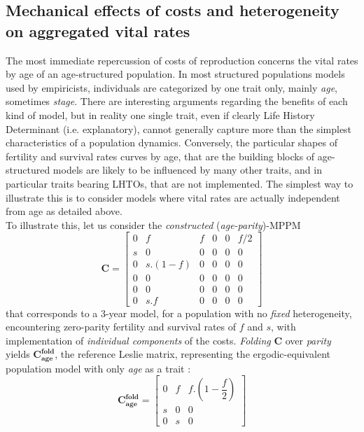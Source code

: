 \documentclass[10pt,a4paper]{article}
\begin{document}
\subsection{Mechanical effects of costs and heterogeneity on aggregated vital rates} %

\label{sec:mecheff}
The most immediate repercussion of costs of reproduction concerns the vital rates by age of an age-structured population. In most structured populations models used by empiricists, individuals are categorized by one trait only, mainly \emph{age}, sometimes \emph{stage}. There are interesting arguments regarding the benefits of each kind of model, but in reality one single trait, even if clearly Life History Determinant (i.e. explanatory), cannot generally capture more than the simplest characteristics of a population dynamics. 
Conversely, the particular shapes of fertility and survival rates curves by age, that are the building blocks of age-structured models are likely to be influenced by many other traits, and in particular traits bearing LHTOs, that are not implemented. The simplest way to illustrate this is to consider models where vital rates are actually independent from age as detailed above.\\

To illustrate this, let us consider the \emph{constructed} (\emph{age-parity})-MPPM 
\[
\mathbf{C}=\begin{bmatrix} 0 & {f} & {f} & 0 & 0 & {f/2}\\
{s} & 0 & 0  & 0 & 0 & 0\\ 0 & {s.(1-f)} & 0 & 0  & 0 & 0 \\
0 & 0 & 0 & 0 & 0  & 0 \\ 0 & 0 & 0 & 0  & 0 & 0 \\
0 & {s.f}  & 0 & 0 & 0 & 0 \end{bmatrix}  
\]
that corresponds to a 3-year model, for a population with no \emph{fixed} heterogeneity, encountering zero-parity fertility and survival rates of $f$ and $s$, with implementation of \emph{individual components} of the costs. \emph{Folding} $\mathbf{C}$ over \emph{parity} yields $\mathbf{C_{age}^{fold}}$, the reference Leslie matrix, representing the ergodic-equivalent population model with only \emph{age} as a trait : 
\[\mathbf{C^{fold}_{age}}=
\begin{bmatrix} 0 & f & f.(1-\dfrac{f}{2}) \\  s & 0 & 0 \\  0 & s & 0 \end{bmatrix} \]  
 
\end{document}
